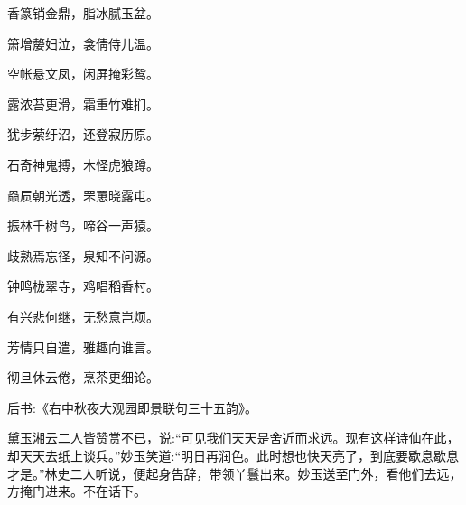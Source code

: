 \begin{poem}
    \begin{pl}香篆销金鼎，脂冰腻玉盆。\end{pl}

    \begin{pl}箫增嫠妇泣，衾倩侍儿温。\end{pl}

    \begin{pl}空帐悬文凤，闲屏掩彩鸳。\end{pl}

    \begin{pl}露浓苔更滑，霜重竹难扪。\end{pl}

    \begin{pl}犹步萦纡沼，还登寂历原。\end{pl}

    \begin{pl}石奇神鬼搏，木怪虎狼蹲。\end{pl}

    \begin{pl}赑屃朝光透，罘罳晓露屯。\end{pl}

    \begin{pl}振林千树鸟，啼谷一声猿。\end{pl}

    \begin{pl}歧熟焉忘径，泉知不问源。\end{pl}

    \begin{pl}钟鸣栊翠寺，鸡唱稻香村。\end{pl}

    \begin{pl}有兴悲何继，无愁意岂烦。\end{pl}

    \begin{pl}芳情只自遣，雅趣向谁言。\end{pl}

    \begin{pl}彻旦休云倦，烹茶更细论。\end{pl}

\end{poem}


\begin{parag}
    后书:《右中秋夜大观园即景联句三十五韵》。
\end{parag}


\begin{parag}
    黛玉湘云二人皆赞赏不已，说:“可见我们天天是舍近而求远。现有这样诗仙在此，却天天去纸上谈兵。”妙玉笑道:“明日再润色。此时想也快天亮了，到底要歇息歇息才是。”林史二人听说，便起身告辞，带领丫鬟出来。妙玉送至门外，看他们去远，方掩门进来。不在话下。
\end{parag}


